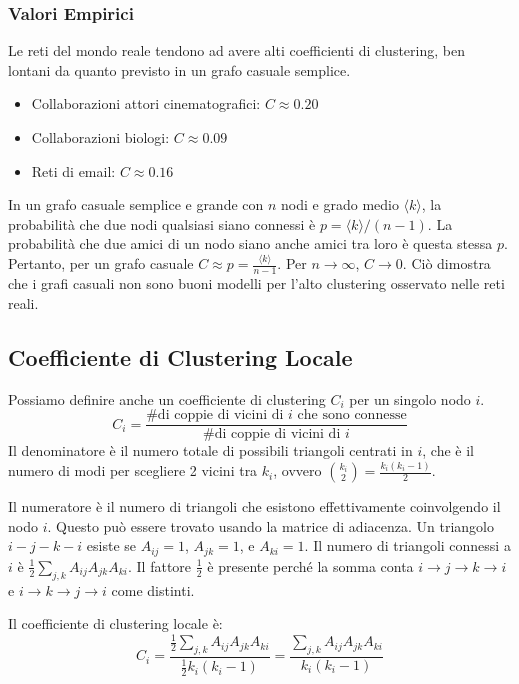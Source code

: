 \subsubsection{Valori Empirici}
Le reti del mondo reale tendono ad avere alti coefficienti di clustering, ben lontani da quanto previsto in un grafo casuale semplice.
\begin{itemize}
\item Collaborazioni attori cinematografici: $C \approx 0.20$
\item Collaborazioni biologi: $C \approx 0.09$
\item Reti di email: $C \approx 0.16$
\end{itemize}
In un grafo casuale semplice e grande con $n$ nodi e grado medio $\langle k \rangle$, la probabilità che due nodi qualsiasi siano connessi è $p = \langle k \rangle / (n-1)$. La probabilità che due amici di un nodo siano anche amici tra loro è questa stessa $p$.
Pertanto, per un grafo casuale $C \approx p = \frac{\langle k \rangle}{n-1}$. Per $n \to \infty$, $C \to 0$. Ciò dimostra che i grafi casuali non sono buoni modelli per l'alto clustering osservato nelle reti reali.

\subsection{Coefficiente di Clustering Locale}
Possiamo definire anche un coefficiente di clustering $C_i$ per un singolo nodo $i$.
\begin{equation}
C_i = \frac{\text{\# di coppie di vicini di } i \text{ che sono connesse}}{\text{\# di coppie di vicini di } i}
\end{equation}
Il denominatore è il numero totale di possibili triangoli centrati in $i$, che è il numero di modi per scegliere 2 vicini tra $k_i$, ovvero $\binom{k_i}{2} = \frac{k_i(k_i-1)}{2}$.

\noindent Il numeratore è il numero di triangoli che esistono effettivamente coinvolgendo il nodo $i$. Questo può essere trovato usando la matrice di adiacenza. Un triangolo $i-j-k-i$ esiste se $A_{ij}=1$, $A_{jk}=1$, e $A_{ki}=1$. Il numero di triangoli connessi a $i$ è $\frac{1}{2}\sum_{j,k} A_{ij} A_{jk} A_{ki}$. Il fattore $\frac{1}{2}$ è presente perché la somma conta $i\to j\to k\to i$ e $i\to k\to j\to i$ come distinti.

\noindent Il coefficiente di clustering locale è:
\begin{equation}
C_i = \frac{\frac{1}{2}\sum_{j,k} A_{ij} A_{jk} A_{ki}}{\frac{1}{2}k_i(k_i-1)} = \frac{\sum_{j,k} A_{ij} A_{jk} A_{ki}}{k_i(k_i-1)}
\end{equation}


